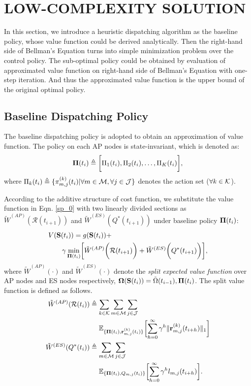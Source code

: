 \section{LOW-COMPLEXITY SOLUTION}
In this section, we introduce a heuristic dispatching algorithm as the baseline policy, whose value function could be derived analytically.
Then the right-hand side of Bellman's Equation turns into simple minimization problem over the control policy. The sub-optimal policy could be obtained by evaluation of approximated value function on right-hand side of Bellman's Equation with one-step iteration. And thus the approximated value function is the upper bound of the original optimal policy.

\subsection{Baseline Dispatching Policy}
The baseline dispatching policy is adopted to obtain an approximation of value function. The policy on each AP nodes is state-invariant, which is denoted as:
\begin{align}
    \boldsymbol{\Pi}(t_i) \triangleq \bigg[\Pi_1(t_i), \Pi_2(t_i), \dots, \Pi_K(t_i)\bigg],
\end{align}
where $\Pi_k(t_i) \triangleq \{\pi^{(k)}_{m,j}(t_{i}) | \forall m\in\mathcal{M},\forall j\in\mathcal{J}\}$ denotes the action set ($\forall k\in\mathcal{K}$).

According to the additive structure of cost function, we substitute the value function in Eqn. \ref{sp_0} with two linearly divided sections as $\tilde{W}^{(AP)}(\mathcal{R}(t_{i+1}))$ and $\tilde{W}^{(ES)}(Q^*(t_{i+1}))$ under baseline policy $\boldsymbol{\Pi}(t_{i})$:
\begin{align}
    &V(\Stat(t_{i})) = g(\Stat(t_{i})) +
    \nonumber\\
    &~~~~~~\gamma \min_{\BaseLine(t_i)} \Bracket{ \tilde{W}^{(AP)}\Paren{\mathcal{R}(t_{i+1})} + \tilde{W}^{(ES)}\Paren{Q^*(t_{i+1})} },
\end{align}
where $\tilde{W}^{(AP)}(\cdot)$ and $\tilde{W}^{(ES)}(\cdot)$ denote the \emph{split expected value function} over AP nodes and ES nodes respectively, $\boldsymbol{\Omega}(\mathbf{S}(t_{i})) = \tilde{\Omega}(t_{i-1}), \boldsymbol{\Pi}(t_i)$. The split value function is defined as follows.
\begin{align}
    \tilde{W}^{(AP)}(\mathcal{R}(t_{i})) &\define \sum_{k\in\apSet}\sum_{m\in\esSet}\sum_{j\in\jSpace}
        \nonumber\\
        &~~~~\mathbb{E}_{\{\BaseLine(t_i), \vec{r}^{(k)}_{m,j}(t_{i})\}}\Bracket{
            \sum_{h=0}^{\infty} \gamma^{h} \Inorm{\vec{r}^{(k)}_{m,j}(t_{i+h})}
        }
    \\
    \tilde{W}^{(ES)}(Q^*(t_{i})) &\define \sum_{m\in\esSet}\sum_{j\in\jSpace}
        \nonumber\\
        &~~~~\mathbb{E}_{\{\BaseLine(t_i), Q_{m,j}(t_{i})\}}\Bracket{
            \sum_{h=0}^{\infty} \gamma^{h} l_{m,j}(t_{i+h})
        }.
\end{align}
        
